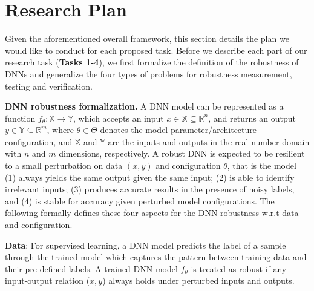 \section{Research Plan}\label{plan}
Given the aforementioned overall framework, this section details the plan we would like to conduct for each proposed task.
Before we describe each part of our research task (\textbf{Tasks 1-4}), we first formalize the definition of the robustness of DNNs and generalize the four types of problems for robustness measurement, testing and verification. 

{\textbf{DNN robustness formalization.}} A DNN model can be represented as a function $f_{\theta}:\mathbb{X}\rightarrow\mathbb{Y}$, which accepts an input $x\in \mathbb{X} \subseteq \mathbb{R}^n$, and returns an output $y\in \mathbb{Y} \subseteq \mathbb{R}^m$, where $\theta\in\Theta$ denotes the model parameter/architecture configuration, and $\mathbb{X}$ and $\mathbb{Y}$ are the inputs and outputs in the real number domain with $n$ and $m$ dimensions, respectively. A robust DNN is expected to be resilient to a small perturbation on data $(x,y)$ and configuration $\theta$, that is the model (1)  always yields the same output given the same input; (2) is able to identify irrelevant inputs; (3) produces accurate results in the presence of noisy labels, and (4) is stable for accuracy given perturbed model configurations. 
The following formally defines these four aspects for the DNN robustness w.r.t data and configuration.

\bi
\item{\textbf{Data}:} For supervised learning, a DNN model predicts the label of a sample through the trained model which captures the pattern between training data and their pre-defined labels. A trained DNN model $f_{\theta}$ is treated as robust if any input-output relation ($x,y$) always holds under perturbed inputs and outputs.

